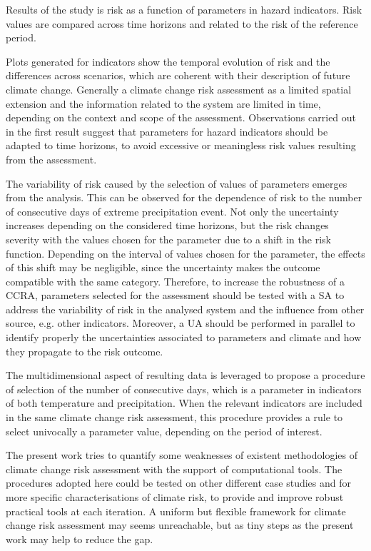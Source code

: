 Results of the study is risk as a function of parameters in hazard indicators. Risk values are compared across time horizons and related to the risk of the reference period.

Plots generated for indicators show the temporal evolution of risk and the differences across scenarios, which are coherent with their description of future climate change. Generally a climate change risk assessment as a limited spatial extension and the information related to the system are limited in time, depending on the context and scope of the assessment. Observations carried out in the first result suggest that parameters for hazard indicators should be adapted to time horizons, to avoid excessive or meaningless risk values resulting from the assessment.

The variability of risk caused by the selection of values of parameters emerges from the analysis. This can be observed for the dependence of risk to the number of consecutive days of extreme precipitation event. Not only the uncertainty increases depending on the considered time horizons, but the risk changes severity with the values chosen for the parameter due to a shift in the risk function. Depending on the interval of values chosen for the parameter, the effects of this shift may be negligible, since the uncertainty makes the outcome compatible with the same category. Therefore, to increase the robustness of a \gls{CCRA}, parameters selected for the assessment should be tested with a \gls{SA} to address the variability of risk in the analysed system and the influence from other source, e.g. other indicators. Moreover, a \gls{UA} should be performed in parallel to identify properly the uncertainties associated to parameters and climate and how they propagate to the risk outcome.

The multidimensional aspect of resulting data is leveraged to propose a procedure of selection of the number of consecutive days, which is a parameter in indicators of both temperature and precipitation. When the relevant indicators are included in the same climate change risk assessment, this procedure provides a rule to select univocally a parameter value, depending on the period of interest.

The present work tries to quantify some weaknesses of existent methodologies of climate change risk assessment with the support of computational tools. The procedures adopted here could be tested on other different case studies and for more specific characterisations of climate risk, to provide and improve robust practical tools at each iteration.
A uniform but flexible framework for climate change risk assessment may seems unreachable, but as tiny steps as the present work may help to reduce the gap.
